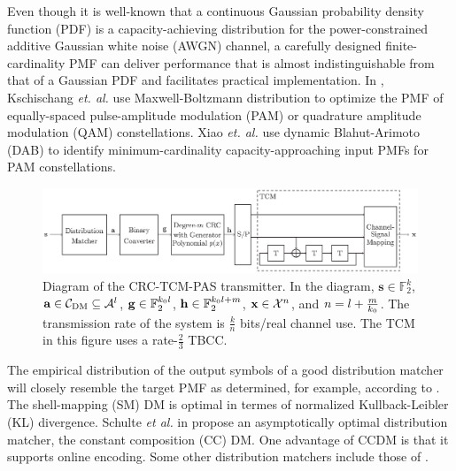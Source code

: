\documentclass [PhD] {uclathes}
\begin{document}
Even though it is well-known that 
a continuous Gaussian probability density function (PDF) is a
capacity-achieving distribution for the power-constrained additive Gaussian white noise (AWGN) channel, a carefully designed  finite-cardinality PMF  can deliver performance that is almost indistinguishable from that of a Gaussian PDF and facilitates practical implementation.  In \cite{Kschischangoptimaldist}, Kschischang \emph{et. al.} use Maxwell-Boltzmann distribution to optimize the PMF of equally-spaced pulse-amplitude modulation (PAM) or quadrature amplitude modulation (QAM) constellations. Xiao \emph{et. al.} use dynamic Blahut-Arimoto (DAB) to identify  minimum-cardinality capacity-approaching input PMFs for PAM constellations\cite{xiao2021finite}. 
\begin{figure}[t]
    \centering
    \includegraphics[width=1\linewidth]{figures/CRC_TCM_PAS_v2.eps }
    \caption{Diagram of the CRC-TCM-PAS transmitter. In the diagram, $\mathbf{s}\in\mathbb{F}_2^{k}$, $\mathbf{a}\in\mathcal{C}_{\mathrm{DM}}\subseteq\mathcal{A}^{l}$, $\mathbf{g}\in\mathbb{F}_2^{k_0 l}$,   $\mathbf{h}\in\mathbb{F}_2^{k_0 l+m}$, $\mathbf{x}\in\mathcal{X}^{n}$, and $n=l+\frac{m}{k_0}$. The transmission rate of the system is $\frac{k}{n}$ bits/real channel use. The TCM in this figure uses a rate-$\frac{2}{3}$ TBCC.}
    \label{fig: transmitter}
\end{figure}


The empirical distribution of the output symbols of a good distribution matcher will closely resemble the target PMF as determined, for example, according to \cite{xiao2021finite}. The shell-mapping (SM) DM  \cite{SMDM_amjad,ccdm_smdm_comp_schulte}  is optimal in termes of normalized Kullback-Leibler (KL) divergence.  Schulte \emph{et al.} in \cite{CCDM_schulte} propose an asymptotically optimal distribution matcher, the constant composition (CC) DM. 
One advantage of CCDM is that it supports online encoding. 
Some other distribution matchers include those of  \cite{patrick,pikus2019arithmetic,fehenberger2018multiset}.
\end{document}
